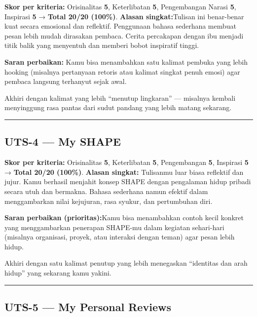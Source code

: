 \documentclass[
  letterpaper,
  DIV=11,
  numbers=noendperiod]{scrreprt}
\begin{document}
\textbf{Skor per kriteria:} Orisinalitas \textbf{5}, Keterlibatan
\textbf{5}, Pengembangan Narasi \textbf{5}, Inspirasi \textbf{5} →
\textbf{Total 20/20 (100\%)}. \textbf{Alasan singkat:}Tulisan ini
benar-benar kuat secara emosional dan reflektif. Penggunaan bahasa
sederhana membuat pesan lebih mudah dirasakan pembaca. Cerita percakapan
dengan ibu menjadi titik balik yang menyentuh dan memberi bobot
inspiratif tinggi.

\textbf{Saran perbaikan:} Kamu bisa menambahkan satu kalimat pembuka
yang lebih hooking (misalnya pertanyaan retoris atau kalimat singkat
penuh emosi) agar pembaca langsung terhanyut sejak awal.

Akhiri dengan kalimat yang lebih ``menutup lingkaran'' --- misalnya
kembali menyinggung rasa pantas dari sudut pandang yang lebih matang
sekarang.

\begin{center}\rule{0.5\linewidth}{0.5pt}\end{center}

\subsection{UTS-4 --- My SHAPE}\label{uts-4-my-shape}

\textbf{Skor per kriteria:} Orisinalitas \textbf{5}, Keterlibatan
\textbf{5}, Pengembangan \textbf{5}, Inspirasi \textbf{5} →
\textbf{Total 20/20 (100\%)}. \textbf{Alasan singkat:} Tulisanmu luar
biasa reflektif dan jujur. Kamu berhasil menjahit konsep SHAPE dengan
pengalaman hidup pribadi secara utuh dan bermakna. Bahasa sederhana
namun efektif dalam menggambarkan nilai kejujuran, rasa syukur, dan
pertumbuhan diri.

\textbf{Saran perbaikan (prioritas):}Kamu bisa menambahkan contoh kecil
konkret yang menggambarkan penerapan SHAPE-mu dalam kegiatan sehari-hari
(misalnya organisasi, proyek, atau interaksi dengan teman) agar pesan
lebih hidup.

Akhiri dengan satu kalimat penutup yang lebih menegaskan ``identitas dan
arah hidup'' yang sekarang kamu yakini.

\begin{center}\rule{0.5\linewidth}{0.5pt}\end{center}

\subsection{UTS-5 --- My Personal
Reviews}\label{uts-5-my-personal-reviews-1}
\end{document}
